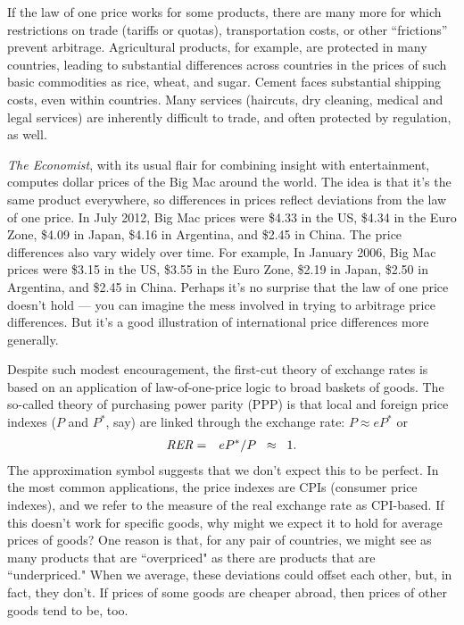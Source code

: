 If the law of one price works for some products,
there are many more for which restrictions on
trade (tariffs or quotas), transportation costs,
or other ``frictions'' prevent arbitrage.
Agricultural products, for example, are protected in many countries,
leading to substantial differences across countries
in the prices of such basic commodities as rice, wheat, and sugar.
Cement faces substantial shipping costs, even within countries.
Many services (haircuts, dry cleaning, medical and legal services)
are inherently difficult to trade,
and often protected by regulation, as well.

{\it The Economist\/}, with its usual flair for combining insight
with entertainment, computes dollar prices of the Big Mac around the
world.
The idea is that it's the same product everywhere, so differences
in prices reflect deviations from the law of one price.
In July 2012, Big Mac prices were \$4.33 in the US,
\$4.34 in the Euro Zone, \$4.09 in Japan, \$4.16 in Argentina,
and \$2.45 in China. The price differences also vary
widely over time. For example, In January 2006, Big Mac prices  were \$3.15 in the US,
\$3.55 in the Euro Zone, \$2.19 in Japan, \$2.50 in Argentina,
and \$2.45 in China. Perhaps it's no surprise that the law of one price doesn't hold --- you can imagine the mess involved in trying to arbitrage price
differences.
But it's a good illustration of international price differences
more generally.


Despite such modest encouragement,
the first-cut theory of exchange rates is based on an application of
law-of-one-price logic to broad baskets of goods.
The so-called theory of purchasing power parity (PPP)
is that local and foreign price indexes ($P$ and $P^*$, say)
are linked through the exchange rate:  $ P \approx e P^* $ or
\begin{eqnarray}
    \mbox{\it RER\/} &=& eP^* /P \;\;\approx\;\; 1.
    \label{eq:ppp}
\end{eqnarray}
The approximation symbol suggests that we don't expect this to be perfect.
In the most common applications, the price indexes are CPIs
(consumer price indexes),
and we refer to the measure of the real exchange rate as CPI-based.
If this doesn't work for specific goods, why might we expect it to hold
for average prices of goods?
One reason is that, for any pair of countries,
we might see as many products that are ``overpriced"
as there are products that are ``underpriced."
When we average, these deviations could offset each other, but,
in fact, they don't. If prices of some goods are cheaper abroad, then prices
of other goods tend to be, too.

